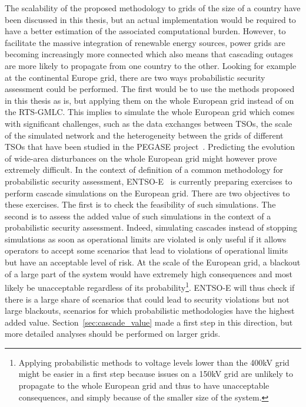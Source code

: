 The scalability of the proposed methodology to grids of the size of a country have been discussed in this thesis, but an actual implementation would be required to have a better estimation of the associated computational burden. However, to facilitate the massive integration of renewable energy sources, power grids are becoming increasingly more connected which also means that cascading outages are more likely to propagate from one country to the other. Looking for example at the continental Europe grid, there are two ways probabilistic security assessment could be performed. The first would be to use the methods proposed in this thesis as is, but applying them on the whole European grid instead of on the RTS-GMLC. This implies to simulate the whole European grid which comes with significant challenges, such as the data exchanges between TSOs, the scale of the simulated network and the heterogeneity between the grids of different TSOs that have been studied in the PEGASE project~\cite{PEGASE_project}. Predicting the evolution of wide-area disturbances on the whole European grid might however prove extremely difficult. In the context of definition of a common methodology for probabilistic security assessment, ENTSO-E~\cite{ENTSOE-PSA_second_report} is currently preparing exercises to perform cascade simulations on the European grid. There are two objectives to these exercises. The first is to check the feasibility of such simulations. The second is to assess the added value of such simulations in the context of a probabilistic security assessment. Indeed, simulating cascades instead of stopping simulations as soon as operational limits are violated is only useful if it allows operators to accept some scenarios that lead to violations of operational limits but have an acceptable level of risk. At the scale of the European grid, a blackout of a large part of the system would have extremely high consequences and most likely be unacceptable regardless of its probability\footnote{Applying probabilistic methods to voltage levels lower than the 400kV grid might be easier in a first step because issues on a 150kV grid are unlikely to propagate to the whole European grid and thus to have unacceptable consequences, and simply because of the smaller size of the system.}. ENTSO-E will thus check if there is a large share of scenarios that could lead to security violations but not large blackouts, scenarios for which probabilistic methodologies have the highest added value. Section~\ref{sec:cascade_value} made a first step in this direction, but more detailed analyses should be performed on larger grids.

